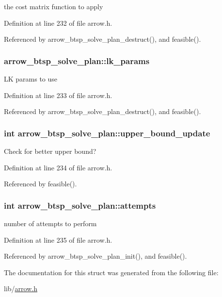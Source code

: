 the cost matrix function to apply 

Definition at line 232 of file arrow.h.

Referenced by arrow\_\-btsp\_\-solve\_\-plan\_\-destruct(), and feasible().\hypertarget{structarrow__btsp__solve__plan_576ea43a6d1de8f9c46f02edf2849122}{
\subsubsection{ {\bf arrow\_\-btsp\_\-solve\_\-plan::lk\_\-params}}}
\label{structarrow__btsp__solve__plan_576ea43a6d1de8f9c46f02edf2849122}


LK params to use 

Definition at line 233 of file arrow.h.

Referenced by arrow\_\-btsp\_\-solve\_\-plan\_\-destruct(), and feasible().\hypertarget{structarrow__btsp__solve__plan_5ac6a38c297df040797c63babc4c02c3}{
\subsubsection{\setlength{\rightskip}{0pt plus 5cm}int {\bf arrow\_\-btsp\_\-solve\_\-plan::upper\_\-bound\_\-update}}}
\label{structarrow__btsp__solve__plan_5ac6a38c297df040797c63babc4c02c3}


Check for better upper bound? 

Definition at line 234 of file arrow.h.

Referenced by feasible().\hypertarget{structarrow__btsp__solve__plan_acfa3d4257a33548a9f60ee568219bc5}{
\subsubsection{\setlength{\rightskip}{0pt plus 5cm}int {\bf arrow\_\-btsp\_\-solve\_\-plan::attempts}}}
\label{structarrow__btsp__solve__plan_acfa3d4257a33548a9f60ee568219bc5}


number of attempts to perform 

Definition at line 235 of file arrow.h.

Referenced by arrow\_\-btsp\_\-solve\_\-plan\_\-init(), and feasible().

The documentation for this struct was generated from the following file:\begin{CompactItemize}
\item 
lib/\hyperlink{arrow_8h}{arrow.h}\end{CompactItemize}
